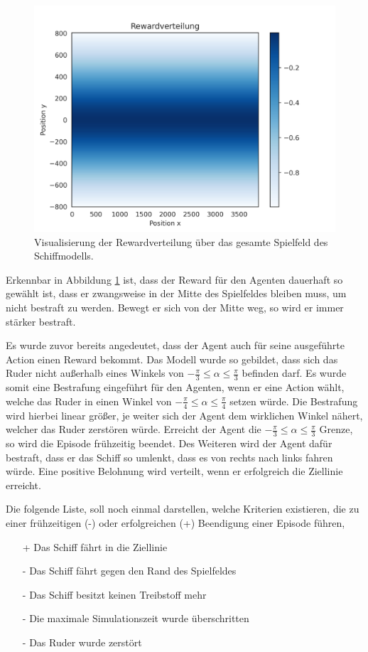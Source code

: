 \documentclass[]{iat}
\begin{document}
\begin{figure}[H]
    \includegraphics[width=\textwidth]{graphics/reward_field.png}
    \centering
    \caption{Visualisierung der Rewardverteilung über das gesamte Spielfeld des Schiffmodells.}
    \label{abb:reward_field}
\end{figure}

Erkennbar in Abbildung \ref{abb:reward_field} ist, dass der Reward für den Agenten dauerhaft so gewählt ist, dass er zwangsweise in der Mitte des Spielfeldes bleiben muss, um nicht bestraft zu werden. Bewegt er sich von der Mitte weg, so wird er immer stärker bestraft.

Es wurde zuvor bereits angedeutet, dass der Agent auch für seine ausgeführte Action einen Reward bekommt. Das Modell wurde so gebildet, dass sich das Ruder nicht außerhalb eines Winkels von $-\frac{\pi}{3} \leq \alpha \leq \frac{\pi}{3}$ befinden darf. Es wurde somit eine Bestrafung eingeführt für den Agenten, wenn er eine Action wählt, welche das Ruder in einen Winkel von $-\frac{\pi}{4} \leq \alpha \leq \frac{\pi}{4}$ setzen würde. Die Bestrafung wird hierbei linear größer, je weiter sich der Agent dem wirklichen Winkel nähert, welcher das Ruder zerstören würde. Erreicht der Agent die $-\frac{\pi}{3} \leq \alpha \leq \frac{\pi}{3}$ Grenze, so wird die Episode frühzeitig beendet. Des Weiteren wird der Agent dafür bestraft, dass er das Schiff so umlenkt, dass es von rechts nach links fahren würde. Eine positive Belohnung wird verteilt, wenn er erfolgreich die Ziellinie erreicht.

Die folgende Liste, soll noch einmal darstellen, welche Kriterien existieren, die zu einer frühzeitigen (-) oder erfolgreichen (+) Beendigung einer Episode führen,
\begin{enumerate}
    \item[+] Das Schiff fährt in die Ziellinie
    \item[-] Das Schiff fährt gegen den Rand des Spielfeldes
    \item[-] Das Schiff besitzt keinen Treibstoff mehr
    \item[-] Die maximale Simulationszeit wurde überschritten
    \item[-] Das Ruder wurde zerstört
\end{enumerate}
\end{document}
